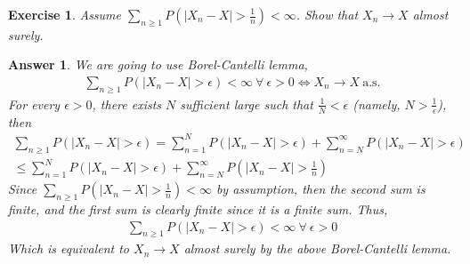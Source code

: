 \documentclass[12pt]{article}
\theoremstyle{colon}
\newtheorem{exercise}{Exercise}
\newtheorem*{answer}{Answer}
\begin{document}
\clearpage

\begin{exercise}
  Assume $\sum_{n \geq 1} P \left( \lvert X_n - X \rvert > \frac{1}{n} \right) < \infty$. Show that $X_n \rightarrow X$ almost surely.
\end{exercise}

\begin{answer}
  We are going to use Borel-Cantelli lemma,
  \begin{gather*}
    \sum_{n \geq 1} P \left( \lvert X_n - X \rvert > \epsilon \right) < \infty \ \forall \ \epsilon > 0 \Longleftrightarrow X_n \rightarrow X \ \text{a.s.}
  \end{gather*}
  For every $\epsilon > 0$, there exists $N$ sufficient large such that $\frac{1}{N} < \epsilon$ (namely, $ N > \frac{1}{\epsilon}$), then
  \begin{gather*}
    \sum_{n \geq 1} P \left( \lvert X_n - X \rvert > \epsilon \right) = \sum_{n = 1}^N P \left( \lvert X_n - X \rvert > \epsilon \right) + \sum_{n = N}^\infty P \left( \lvert X_n - X \rvert > \epsilon \right) \\
    \leq \sum_{n = 1}^N P \left( \lvert X_n - X \rvert > \epsilon \right) + \sum_{n = N}^\infty P \left( \lvert X_n - X \rvert > \frac{1}{n} \right)
  \end{gather*}
  Since $\sum_{n \geq 1} P \left( \lvert X_n - X \rvert > \frac{1}{n} \right) < \infty$ by assumption, then the second sum is finite, and the first sum is clearly finite since it is a finite sum. Thus,
  \begin{gather*}
    \sum_{n \geq 1} P \left( \lvert X_n - X \rvert > \epsilon \right) < \infty \ \forall \ \epsilon > 0
  \end{gather*}
  Which is equivalent to $X_n \rightarrow X$ almost surely by the above Borel-Cantelli lemma.
\end{answer}

\clearpage
\end{document}
